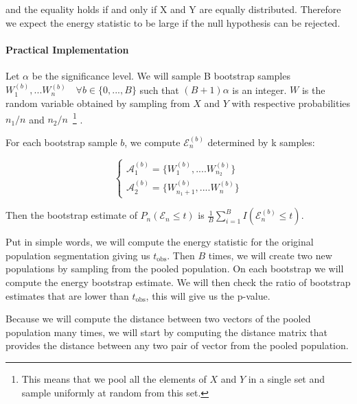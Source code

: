 and the equality holds if and only if X and Y are equally distributed. Therefore we expect the energy statistic to be large if the null hypothesis can be rejected.

\paragraph{Practical Implementation}
Let $\alpha$ be the significance level. We will sample B bootstrap samples $W_1^{(b)},...W_n^{(b)} \quad \forall b \in \{0,...,B\}$ such that $(B+1)\alpha$ is an integer. $W$ is the random variable obtained by sampling from $X$ and $Y$ with respective probabilities $n_1/n$ and $n_2/n$~\footnote{This means that we pool all the elements of $X$ and $Y$ in a single set and sample uniformly at random from this set.} . 

For each bootstrap sample $b$, we compute $\mathcal{E}_{n}^{(b)}$ determined by k samples:

\begin{equation}
\begin{cases}
	\mathcal{A}_1^{(b)} = \{W_1^{(b)},....W_{n_2}^{(b)}\}\\
	\mathcal{A}_2^{(b)} = \{W_{n_1 + 1}^{(b)},....W_{n}^{(b)}\}
\end{cases}
\end{equation}

Then the bootstrap estimate of $P_n(\mathcal{E}_{n} \le t)$ is $\frac{1}{B} \sum_{i=1}^B I(\mathcal{E}_{n}^{(b)} \le t)$.

Put in simple words, we will compute the energy statistic for the original population segmentation giving us $t_\text{obs}$. Then $B$ times, we will create two new populations by sampling from the pooled population. On each bootstrap we will compute the energy bootstrap estimate. We will then check the ratio of bootstrap estimates that are lower than $t_\text{obs}$, this will give us the p-value. 

Because we will compute the distance between two vectors of the pooled population many times, we will start by computing the distance matrix that provides the distance between any two pair of vector from the pooled population.

